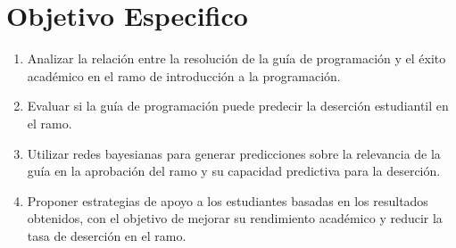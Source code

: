 \hypertarget{objetivo_especifico}{%
    \section{Objetivo Especifico}\label{Objetivo Especifico}}
    \vfill

    \begin{enumerate}
        \item Analizar la relación entre la resolución de la guía de programación y el éxito académico en el ramo de introducción a la programación.
        \item Evaluar si la guía de programación puede predecir la deserción estudiantil en el ramo.
        \item Utilizar redes bayesianas para generar predicciones sobre la relevancia de la guía en la aprobación del ramo y su capacidad predictiva para la deserción.
        \item Proponer estrategias de apoyo a los estudiantes basadas en los resultados obtenidos, con el objetivo de mejorar su rendimiento académico y reducir la tasa de deserción en el ramo.
      \end{enumerate}
      \vfill